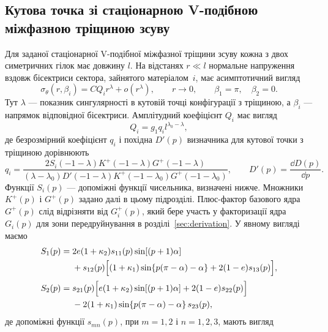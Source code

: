 \subsection{Кутова точка зі стаціонарною V-подібною міжфазною тріщиною зсуву}

Для заданої стаціонарної V-подібної міжфазної тріщини зсуву кожна з двох симетричних гілок має довжину $l$. На відстанях $r\ll l$ нормальне напруження вздовж бісектриси сектора, зайнятого матеріалом~$i$, має асимптотичний вигляд~\citep{NazarenkoKipnis2022Stress}
\begin{equation}
\label{eq:app-cracked-field}
  \sigma_\theta(r,\beta_i)
  =CQ_i r^\lambda+o\!\left(r^\lambda\right),
  \qquad r\to0,
  \qquad
  \beta_1=\pi,\quad \beta_2=0.
\end{equation}
Тут $\lambda$ — показник сингулярності в кутовій точці конфігурації з тріщиною, а $\beta_i$ — напрямок відповідної бісектриси. Амплітудний коефіцієнт $Q_i$ має вигляд
\begin{equation*}
  Q_i=g_1q_i l^{\lambda_0-\lambda},
\end{equation*}
де безрозмірний коефіцієнт $q_i$ і похідна $D'(p)$ визначника для кутової точки з тріщиною дорівнюють
\begin{equation*}
  q_i=
  \frac{2S_i(-1-\lambda)K^+(-1-\lambda)G^+(-1-\lambda)}
  {(\lambda-\lambda_0)D'(-1-\lambda)
   K^+(-1-\lambda_0)G^+(-1-\lambda_0)},
  \qquad
  D'(p)=\frac{\dd D(p)}{\dd p}.
\end{equation*}
Функції $S_i(p)$ — допоміжні функції чисельника, визначені нижче. Множники $K^+(p)$ і $G^+(p)$ задано далі в цьому підрозділі. Плюс-фактор базового ядра $G^+(p)$ слід відрізняти від $G_i^+(p)$, який бере участь у факторизації ядра $G_i(p)$ для зони передруйнування в розділі~\ref{sec:derivation}. У явному вигляді маємо
\begin{equation*}
\begin{aligned}
  S_1(p)={}&2e(1+\kappa_2)s_{11}(p)\sin[(p+1)\alpha]\\
  &+s_{12}(p)
  \Bigl[(1+\kappa_1)\sin\{p(\pi-\alpha)-\alpha\}
        +2(1-e)s_{13}(p)\Bigr],\\[2pt]
  S_2(p)={}&s_{21}(p)
  \Bigl[e(1+\kappa_2)\sin[(p+1)\alpha]
        +2(1-e)s_{22}(p)\Bigr]\\
  &-2(1+\kappa_1)\sin\{p(\pi-\alpha)-\alpha\}\,s_{23}(p),
\end{aligned}
\end{equation*}
де допоміжні функції $s_{mn}(p)$, при $m=1,2$ і $n=1,2,3$, мають вигляд
